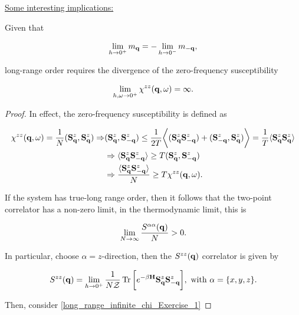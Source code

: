 \documentclass{homework}
\begin{document}
\underline{Some interesting implications:}

\begin{tcolorbox}[colback=yellow!10!white,colframe=red!75!black,lowerbox=invisible, title = Long-range order and magnetic 
susceptibility]

Given that 

$$
\lim_{h \rightarrow 0^+} m_{{\bf q}} = -
\lim_{h \rightarrow 0^-} m_{-{\bf q}},
$$

long-range order requires the divergence of the zero-frequency susceptibility 

$$
    \lim_{h, \omega \rightarrow 0^+} \chi^{zz}({\bf q}, \omega) = \infty.
$$
\end{tcolorbox}

\begin{proof}

In effect, the zero-frequency susceptibility is defined as 

\begin{equation}
\begin{split}
     \chi^{zz}({\bf q}, \omega) = \frac{1}{N} ({\bf S}^z_{\bf q}, {\bf S}^z_{{\bf q}}) \Rightarrow& ({\bf S}^z_{\bf q}, {\bf S}^z_{-{\bf q}})  \leq \frac{1}{2T} \bigg \langle ({\bf S}^z_{\bf q} {\bf S}^z_{-{\bf q}}) + ({\bf S}^z_{-\bf q}, {\bf S}^z_{{\bf q}}) \bigg \rangle = \frac{1}{T} \langle {\bf S}^z_{\bf q} {\bf S}^z_{{\bf q}} \rangle \\
     & \Rightarrow \langle {\bf S}^z_{\bf q} {\bf S}^z_{-{\bf q}} \rangle \geq T  ({\bf S}^z_{\bf q}, {\bf S}^z_{-{\bf q}}) \\
     & \Rightarrow \frac{\langle {\bf S}^z_{\bf q} {\bf S}^z_{-{\bf q}} \rangle}{N} \geq {T}\chi^{zz}({\bf q}, \omega).
     \label{long_range_infinite_chi_Exercise_1}
\end{split}
\end{equation}

If the system has true-long range order, then it follows that the two-point correlator has a non-zero limit, in the thermodynamic limit, this is 

$$
\lim_{N\rightarrow \infty} \frac{S^{\alpha \alpha}({\bf q})}{N} > 0. 
$$

In particular, choose $\alpha = z$-direction, then the $S^{zz}({\bf q})$ correlator is given by 

$$ 
S^{zz}({\bf q}) = \lim_{h \rightarrow 0^+} \frac{1}{N\mathcal{Z}} \Tr \bigg[e^{- \beta {\bf H}} {{\bf S}}_{{\bf q}}^z {{\bf S}}_{{\bf -q}}^z\bigg], \textnormal{ with } \alpha = \{x,y,z\}.
$$

Then, consider \cref{long_range_infinite_chi_Exercise_1}


\end{proof}
\end{document}
